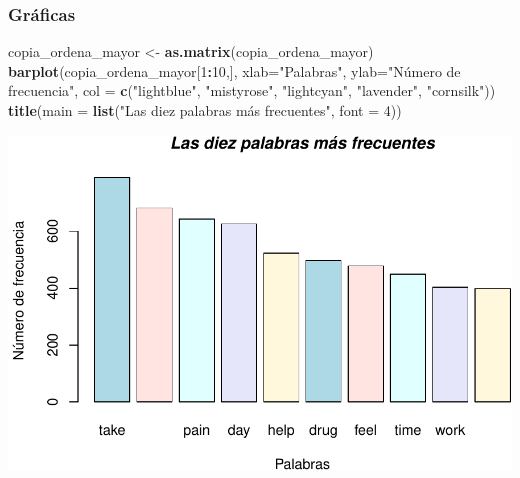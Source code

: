 \documentclass[spanish,]{article}
\newenvironment{Shaded}{\begin{snugshade}}{\end{snugshade}}
\newcommand{\DataTypeTok}[1]{\textcolor[rgb]{0.13,0.29,0.53}{#1}}
\newcommand{\DecValTok}[1]{\textcolor[rgb]{0.00,0.00,0.81}{#1}}
\newcommand{\KeywordTok}[1]{\textcolor[rgb]{0.13,0.29,0.53}{\textbf{#1}}}
\newcommand{\NormalTok}[1]{#1}
\newcommand{\OperatorTok}[1]{\textcolor[rgb]{0.81,0.36,0.00}{\textbf{#1}}}
\newcommand{\StringTok}[1]{\textcolor[rgb]{0.31,0.60,0.02}{#1}}
\begin{document}
\hypertarget{graficas}{%
\subsubsection{Gráficas}\label{graficas}}

\begin{Shaded}
\begin{Highlighting}[]
\NormalTok{copia_ordena_mayor <-}\StringTok{ }\KeywordTok{as.matrix}\NormalTok{(copia_ordena_mayor)}
\KeywordTok{barplot}\NormalTok{(copia_ordena_mayor[}\DecValTok{1}\OperatorTok{:}\DecValTok{10}\NormalTok{,],  }\DataTypeTok{xlab=}\StringTok{"Palabras"}\NormalTok{, }\DataTypeTok{ylab=}\StringTok{"Número de frecuencia"}\NormalTok{,}
        \DataTypeTok{col =} \KeywordTok{c}\NormalTok{(}\StringTok{"lightblue"}\NormalTok{, }\StringTok{"mistyrose"}\NormalTok{, }\StringTok{"lightcyan"}\NormalTok{,}
                \StringTok{"lavender"}\NormalTok{, }\StringTok{"cornsilk"}\NormalTok{))}
\KeywordTok{title}\NormalTok{(}\DataTypeTok{main =} \KeywordTok{list}\NormalTok{(}\StringTok{"Las diez palabras más frecuentes"}\NormalTok{, }\DataTypeTok{font =} \DecValTok{4}\NormalTok{))}
\end{Highlighting}
\end{Shaded}

\includegraphics{practica_files/figure-latex/unnamed-chunk-33-1.pdf}
\end{document}
